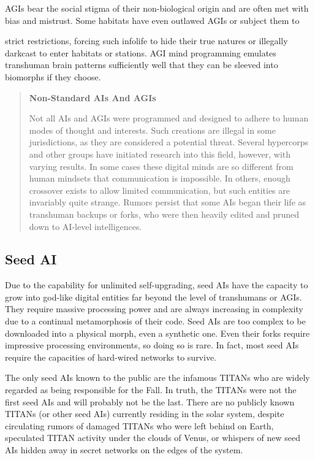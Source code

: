 AGIs bear the social stigma of their non-biological origin and are often met with bias and mistrust. Some habitats have even outlawed AGIs or subject them to 

strict restrictions, forcing such infolife to hide their true natures or illegally darkcast to enter habitats or stations. AGI mind programming emulates transhuman brain patterns sufficiently well that they can be sleeved into biomorphs if they choose. 

\begin{quotation} \textbf{Non-Standard AIs And AGIs} 

Not all AIs and AGIs were programmed and designed to adhere to human modes of thought and interests. Such creations are illegal in some jurisdictions, as they are considered a potential threat. Several hypercorps and other groups have initiated research into this field, however, with varying results. In some cases these digital minds are so different from human mindsets that communication is impossible. In others, enough crossover exists to allow limited communication, but such entities are invariably quite strange. Rumors persist that some AIs began their life as transhuman backups or forks, who were then heavily edited and pruned down to AI-level intelligences. \end{quotation} 

\subsection{Seed AI} 

Due to the capability for unlimited self-upgrading, seed AIs have the capacity to grow into god-like digital entities far beyond the level of transhumans or AGIs. They require massive processing power and are always increasing in complexity due to a continual metamorphosis of their code. Seed AIs are too complex to be downloaded into a physical morph, even a synthetic one. Even their forks require impressive processing environments, so doing so is rare. In fact, most seed AIs require the capacities of hard-wired networks to survive. 

The only seed AIs known to the public are the infamous TITANs who are widely regarded as being responsible for the Fall. In truth, the TITANs were not the first seed AIs and will probably not be the last. There are no publicly known TITANs (or other seed AIs) currently residing in the solar system, despite circulating rumors of damaged TITANs who were left behind on Earth, speculated TITAN activity under the clouds of Venus, or whispers of new seed AIs hidden away in secret networks on the edges of the system. 

